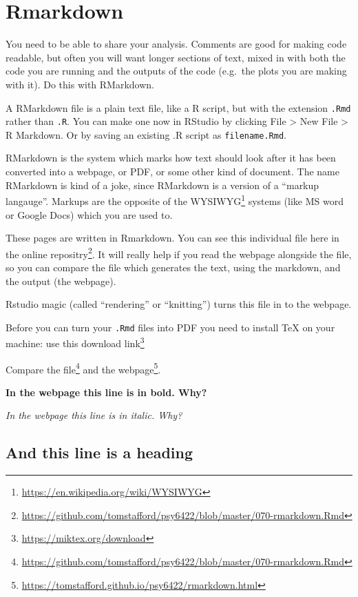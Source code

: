 \documentclass[
  12pt,
  a5paper,
]{book}
\DeclareRobustCommand{\href}[2]{#2\footnote{\url{#1}}}
\begin{document}
\hypertarget{rmarkdown}{%
\chapter{Rmarkdown}\label{rmarkdown}}

You need to be able to share your analysis. Comments are good for making code readable, but often you will want longer sections of text, mixed in with both the code you are running and the outputs of the code (e.g.~the plots you are making with it). Do this with RMarkdown.

A RMarkdown file is a plain text file, like a R script, but with the extension \texttt{.Rmd} rather than \texttt{.R}. You can make one now in RStudio by clicking File \textgreater{} New File \textgreater{} R Markdown. Or by saving an existing .R script as \texttt{filename.Rmd}.

RMarkdown is the system which marks how text should look after it has been converted into a webpage, or PDF, or some other kind of document. The name RMarkdown is kind of a joke, since RMarkdown is a version of a ``markup langauge''. Markups are the opposite of the \href{https://en.wikipedia.org/wiki/WYSIWYG}{WYSIWYG} systems (like MS word or Google Docs) which you are used to.

These pages are written in Rmarkdown. You can see this individual file \href{https://github.com/tomstafford/psy6422/blob/master/070-rmarkdown.Rmd}{here in the online repositry}. It will really help if you read the webpage alongside the file, so you can compare the file which generates the text, using the markdown, and the output (the webpage).

Rstudio magic (called ``rendering'' or ``knitting'') turns this file in to the webpage.

Before you can turn your \texttt{.Rmd} files into PDF you need to install TeX on your machine: \href{https://miktex.org/download}{use this download link}

Compare the \href{https://github.com/tomstafford/psy6422/blob/master/070-rmarkdown.Rmd}{file} and the \href{https://tomstafford.github.io/psy6422/rmarkdown.html}{webpage}.

\textbf{In the webpage this line is in bold. Why?}

\emph{In the webpage this line is in italic. Why?}

\hypertarget{and-this-line-is-a-heading}{%
\section{And this line is a heading}\label{and-this-line-is-a-heading}}
\end{document}
